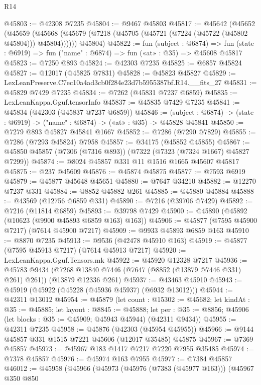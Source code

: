 \begin{lexlean}{R14}
\begin{coremodule}
@45803 := @42308 @7235
@45804 := @9467 @45803
@45817 := @45642
    (@45652
      (@45659 (@45668 (@45679 (@7218 (@45705 (@45721 (@7224 (@45722 (@45802 @45804))) @45804))))))
      @45804)
@45822 := fun (subject : @6874) =>
  fun (state : @6919) => fun ("name" : @6874) => fun («at» : @35) => @45608 @45817
@45823 := @7250 @893
@45824 := @42303 @7235
@45825 := @6857 @45824
@45827 := @12017 (@45825 @7831)
@45828 := @45823 @45827
@45829 := LexLeanPreserve.C7ec10a4ad3cb0f284e23d7b5955387bf.R14.__fits_27
@45831 := @45829 @7429 @7235
@45834 := @7262 (@45831 @7237 @6859)
@45835 := LexLeanKappa.Gguf.tensorInfo
@45837 := @45835 @7429 @7235
@45841 := @45834 (@42303 (@45837 @7237 @6859))
@45846 := (subject : @6874) -> (state : @6919) -> ("name" : @6874) -> («at» : @35) -> @45828 @45841
@45850 := @7279 @893 @45827 @45841 @1667
@45852 := @7286 (@7290 @7829)
@45855 := @7286 (@7293 @45824) @7958
@45857 := @34175 (@45852 @45855)
@45867 := @45850 @45857 (@7306 (@7316 @893)) (@7322 (@7323 (@7324 @1667) @45827 @7299))
@45874 := @8024 @45857 @331 @11 @1516 @1665 @45607 @45817
@45875 := @237 @45609
@45876 := @45874 @45875
@45877 := @7593 @6919
@45879 := @45877 @45648 @45651
@45880 := @7647 @34210
@45882 := @12270 @7237 @331
@45884 := @8852 @45882 @261
@45885 := @45880 @45884
@45888 := @43569 (@12756 @6859 @331)
@45890 := @7216 (@39706 @7429)
@45892 := @7216 (@11814 @6859)
@45893 := @39798 @7429
@45900 := @45890 (@45892 (@10623 (@9900 @45893 @6859 @163) @163))
@45906 := @45877 (@7595 @45900 @7217) (@7614 @45900 @7217)
@45909 := @9933 @45893 @6859 @163
@45910 := @8870 @7235
@45913 := @9536 (@42478 @45910 @163)
@45919 := @45877 (@7595 @45913 @7217) (@7614 @45913 @7217)
@45920 := LexLeanKappa.Gguf.Tensors.mk
@45922 := @45920 @12328 @7217
@45936 := @45783
    @9434
    (@7268 @13840 @7446 (@7647 (@8852 (@13879 @7446 @331) @261) @261))
    (@13879 @12336 @261)
@45937 := @43463 @45910
@45943 := @45919 (@45922 (@45228 (@45936 @45937) (@6932 @13012)))
@45944 := @42311 @13012
@45954 := @45879
    (let count : @15302 := @45682;
    let kindAt : @35 := @45885;
    let layout : @8845 := @45888;
    let per : @35 := @8856; @45906 (let blocks : @35 := @45909; @45943 @45944) (@42311 @9434))
@45955 := @42311 @7235
@45958 := @45876 (@42303 (@45954 @45955))
@45966 := @9144 @45857 @331 @1515 @7221 @45606 (@12017 @35485) @45875
@45967 := @7369 @45857
@45973 := @45967 @183 @1417 @7217 @7220 @7955 @35485
@45974 := @7378 @45857
@45976 := @45974 @163 @7955
@45977 := @7384 @45857
@46012 := @45958
    (@45966
      (@45973
        (@45976 (@7383 (@45977 @163)))
        (@45967
          @350
          @850

\end{coremodule}
\end{lexlean}
